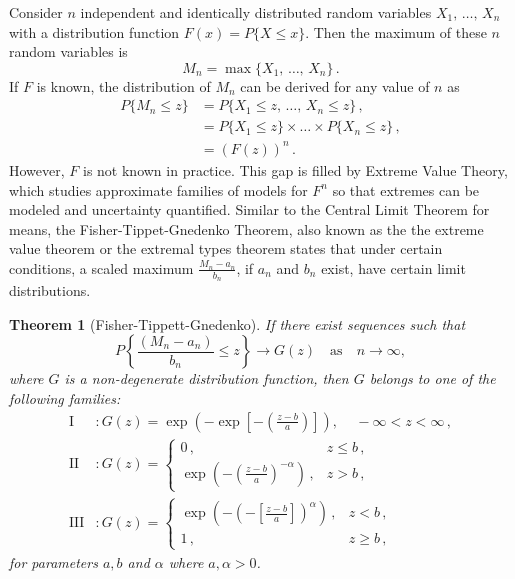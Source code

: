 \documentclass[11pt,a4paper,]{article}
\newtheorem{theorem}{Theorem}[section]
\theoremstyle{definition}
\theoremstyle{definition}
\theoremstyle{definition}
\theoremstyle{remark}
\begin{document}
Consider \(n\) independent and identically distributed random variables \(X_1, \, \ldots, \, X_n\) with a distribution function \(F(x) = P\{X \leq x\}\). Then the maximum of these \(n\) random variables is\\
\begin{equation}\label{eq:evt1}
    M_n = \max \{X_1, \, \ldots, \, X_n\} \, . 
\end{equation}
If \(F\) is known, the distribution of \(M_n\) can be derived for any value of \(n\) as
\begin{align}\label{eq:evt2}
    P\{M_n \leq z \} & = P\{X_1 \leq z, \, \ldots, \, X_n \leq z \} \, ,  \\
    & = P\{X_1 \leq z\} \times \ldots \times P\{X_n \leq z\}\, , \\
    & =  \left(F(z)\right)^n \, .
\end{align}
However, \(F\) is not known in practice. This gap is filled by Extreme Value Theory, which studies approximate families of models for \(F^n\) so that extremes can be modeled and uncertainty quantified. Similar to the Central Limit Theorem for means, the Fisher-Tippet-Gnedenko Theorem, also known as the the extreme value theorem or the extremal types theorem states that under certain conditions, a scaled maximum \(\frac{M_n - a_n}{b_n}\), if \(a_n\) and \(b_n\) exist, have certain limit distributions.

\begin{theorem}[Fisher-Tippett-Gnedenko] \label{thm:FisherTippett}
If there exist sequences such that 
$$ P\left\{ \frac{(M_n - a_n)}{b_n} \leq z \right\} \rightarrow G(z) \quad \text{as} \quad n \to \infty, $$
where $G$ is a non-degenerate distribution function, then $G$ belongs to one of the following families:
\begin{align}\label{eq:EVT3}
    \text{I}&: G(z) = \exp\left( -\exp \left[ - \left( \frac{z-b}{a}\right) \right] \right), \, \quad -\infty < z < \infty\, ,  \\
    \text{II}&: G(z) =  \begin{cases}
                                   0\, ,    &  z \leq b \, ,  \\
                                   \exp \left( - \left( \frac{z-b}{a}\right)^{-\alpha} \right)\, ,   & z > b \, , 
                    \end{cases} \\
     \text{III}&: G(z) =  \begin{cases}
                            \exp \left( - \left(- \left[\frac{z-b}{a}\right]\right)^{\alpha} \right)\, ,   & z < b \, , \\
                             1\, ,    &  z \geq b  \, , 
                    \end{cases}                     
\end{align}
 for parameters $a, b$ and $\alpha$ where $a, \alpha >0$.
\end{theorem}
\end{document}
